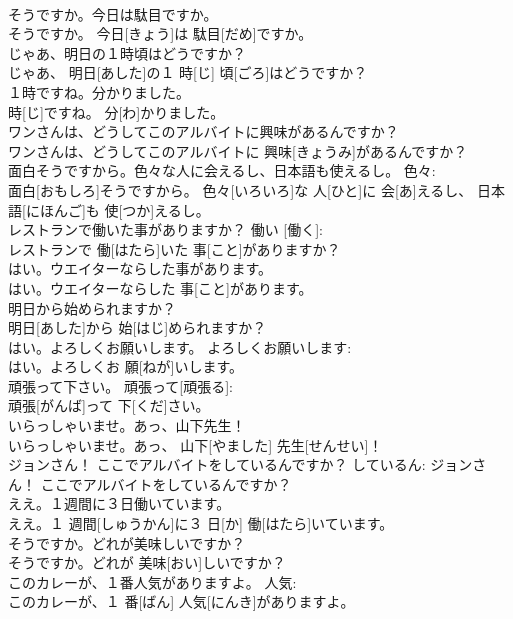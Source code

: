 \documentclass[8pt]{extreport}
\begin{document}
\begin{CJK}{UTF8}{min}
\\	そうですか。今日は駄目ですか。	
\\	そうですか。 今日[きょう]は 駄目[だめ]ですか。	
\\	じゃあ、明日の１時頃はどうですか？	
\\	じゃあ、 明日[あした]の１ 時[じ] 頃[ごろ]はどうですか？	
\\	１時ですね。分かりました。	
\\	時[じ]ですね。 分[わ]かりました。	
\\	ワンさんは、どうしてこのアルバイトに興味があるんですか？	
\\	ワンさんは、どうしてこのアルバイトに 興味[きょうみ]があるんですか？	
\\	面白そうですから。色々な人に会えるし、日本語も使えるし。	色々: 
\\	面白[おもしろ]そうですから。 色々[いろいろ]な 人[ひと]に 会[あ]えるし、 日本語[にほんご]も 使[つか]えるし。	
\\	レストランで働いた事がありますか？	働い [働く]: 
\\	レストランで 働[はたら]いた 事[こと]がありますか？	
\\	はい。ウエイターならした事があります。	
\\	はい。ウエイターならした 事[こと]があります。	
\\	明日から始められますか？	
\\	明日[あした]から 始[はじ]められますか？	
\\	はい。よろしくお願いします。	よろしくお願いします: 
\\	はい。よろしくお 願[ねが]いします。	
\\	頑張って下さい。	頑張って[頑張る]: 
\\	頑張[がんば]って 下[くだ]さい。	
\\	いらっしゃいませ。あっ、山下先生！	
\\	いらっしゃいませ。あっ、 山下[やました] 先生[せんせい]！	
\\	ジョンさん！ ここでアルバイトをしているんですか？	しているん:	ジョンさん！ ここでアルバイトをしているんですか？	
\\	ええ。１週間に３日働いています。	
\\	ええ。１ 週間[しゅうかん]に３ 日[か] 働[はたら]いています。	
\\	そうですか。どれが美味しいですか？	
\\	そうですか。どれが 美味[おい]しいですか？	
\\	このカレーが、１番人気がありますよ。	人気: 
\\	このカレーが、１ 番[ばん] 人気[にんき]がありますよ。	

\end{CJK}
\end{document}
